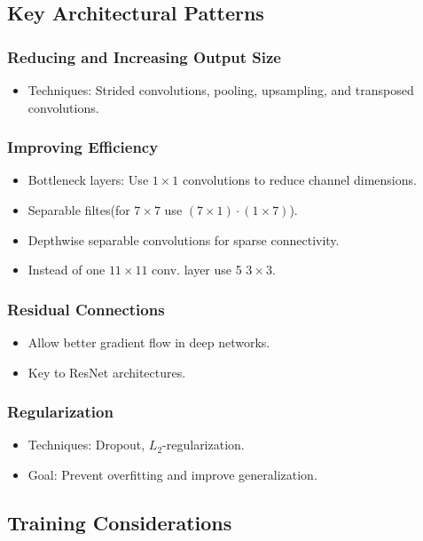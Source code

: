 \subsection{Key Architectural Patterns}
\subsubsection{Reducing and Increasing Output Size}
\begin{itemize}
    \item Techniques: Strided convolutions, pooling, upsampling, and transposed convolutions.
\end{itemize}

\subsubsection{Improving Efficiency}
\begin{itemize}
    \item Bottleneck layers: Use \( 1 \times 1 \) convolutions to reduce channel dimensions.
    \item Separable filtes(for $7\times7$ use $(7\times1) \cdot (1\times7)$).
    \item Depthwise separable convolutions for sparse connectivity.
    \item Instead of one $11 \times 11$ conv. layer use 5 $3\times3$.
\end{itemize}

\subsubsection{Residual Connections}
\begin{itemize}
    \item Allow better gradient flow in deep networks.
    \item Key to ResNet architectures.
\end{itemize}

\subsubsection{Regularization}
\begin{itemize}
    \item Techniques: Dropout, \( L_2 \)-regularization.
    \item Goal: Prevent overfitting and improve generalization.
\end{itemize}

\subsection{Training Considerations}

